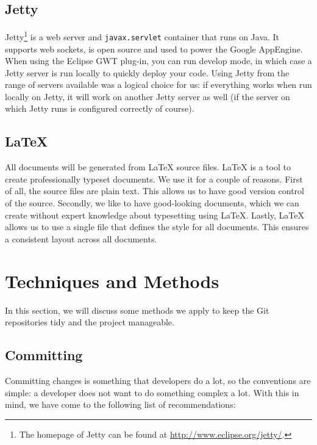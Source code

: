 \subsection{Jetty}
\label{subsec:tools-jetty}
Jetty\footnote{The homepage of Jetty can be found at \url{http://www.eclipse.org/jetty/}.} is a web server and \texttt{javax.servlet} container that runs on Java. It supports web sockets, is open source and used to power the Google AppEngine. When using the Eclipse GWT plug-in, you can run develop mode, in which case a Jetty server is run locally to quickly deploy your code. Using Jetty from the range of servers available was a logical choice for us: if everything works when run locally on Jetty, it will work on another Jetty server as well (if the server on which Jetty runs is configured correctly of course).

\subsection{\LaTeX{}}
\label{subsec:tools-latex}
All documents will be generated from \LaTeX{} source files. \LaTeX{} is a tool to create professionally typeset documents. We use it for a couple of reasons. First of all, the source files are plain text. This allows us to have good version control of the source. Secondly, we like to have good-looking documents, which we can create without expert knowledge about typesetting using \LaTeX{}. Lastly, \LaTeX{} allows us to use a single file that defines the style for all documents. This ensures a consistent layout across all documents.

\section{Techniques and Methods}
In this section, we will discuss some methods we apply to keep the Git repositories tidy and the project manageable.

\subsection{Committing}
Committing changes is something that developers do a lot, so the conventions are simple: a developer does not want to do something complex a lot. With this in mind, we have come to the following list of recommendations:

